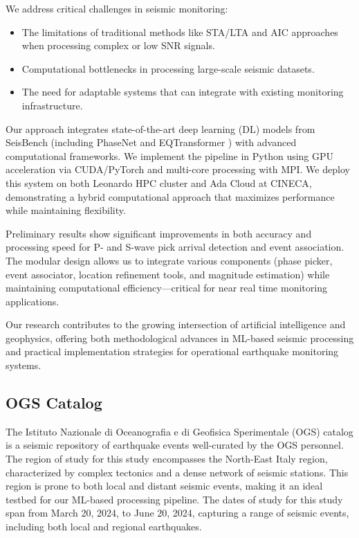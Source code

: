 \documentclass{llncs}
\begin{document}
We address critical challenges in seismic monitoring:
\begin{itemize}
  \item The limitations of traditional methods like STA/LTA and AIC approaches 
  when processing complex or low SNR signals.
  \item Computational bottlenecks in processing large-scale seismic datasets.
  \item The need for adaptable systems that can integrate with existing 
  monitoring infrastructure.
\end{itemize}

Our approach integrates state-of-the-art deep learning (DL) models from 
SeisBench \cite{SeisBench} (including PhaseNet \cite{PhaseNet} and 
EQTransformer \cite{EQTransformer}) with advanced computational frameworks. We 
implement the pipeline in Python using GPU acceleration via CUDA/PyTorch and 
multi-core processing with MPI. We deploy this system on both Leonardo HPC 
cluster and Ada Cloud at CINECA, demonstrating a hybrid computational approach 
that maximizes performance while maintaining flexibility.

Preliminary results show significant improvements in both accuracy and
processing speed for P- and S-wave pick arrival detection and event 
association. The modular design allows us to integrate various components 
(phase picker, event associator, location refinement tools, and magnitude 
estimation) while maintaining computational efficiency—critical for near real 
time monitoring applications.

Our research contributes to the growing intersection of artificial intelligence 
and geophysics, offering both methodological advances in ML-based seismic 
processing and practical implementation strategies for operational earthquake 
monitoring systems.

\subsection{OGS Catalog}

The Istituto Nazionale di Oceanografia e di Geofisica Sperimentale (OGS) 
catalog is a seismic repository of earthquake events well-curated by the OGS 
personnel. The region of study for this study encompasses the North-East Italy 
region, characterized by complex tectonics and a dense network of seismic 
stations. This region is prone to both local and distant seismic events, making 
it an ideal testbed for our ML-based processing pipeline. The dates of study 
for this study span from March 20, 2024, to June 20, 2024, capturing a range of 
seismic events, including both local and regional earthquakes.
\end{document}

